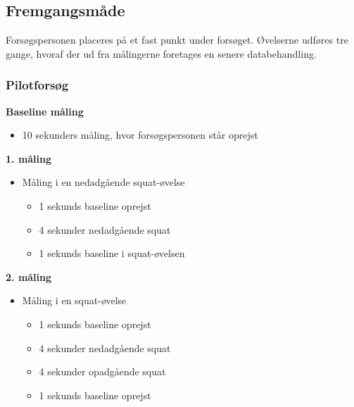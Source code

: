 \subsection{Fremgangsmåde}
Forsøgspersonen placeres på et fast punkt under forsøget. Øvelserne udføres tre gange, hvoraf der ud fra målingerne foretages en senere databehandling. 

\subsubsection{Pilotforsøg}
\textbf{Baseline måling}
\begin{itemize}
\item 10 sekunders måling, hvor forsøgspersonen står oprejst
\end{itemize}

\textbf{1. måling}
\begin{itemize}
\item Måling i en nedadgående squat-øvelse
	\begin{itemize}
	\item 1 sekunds baseline oprejst
	\item 4 sekunder nedadgående squat 
	\item 1 sekunds baseline i squat-øvelsen
	\end{itemize}
\end{itemize}
	
\textbf{2. måling}
\begin{itemize}
\item Måling i en squat-øvelse
	\begin{itemize}
	\item 1 sekunds baseline oprejst
	\item 4 sekunder nedadgående squat 
	\item 4 sekunder opadgående squat
	\item 1 sekunds baseline oprejst
	\end{itemize}
\end{itemize}


